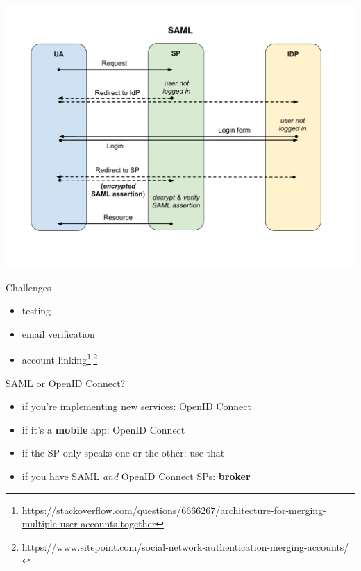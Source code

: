 \documentclass[ignorenonframetext,aspectratio=169]{beamer}
\providecommand{\tightlist}{%
  \setlength{\itemsep}{0pt}\setlength{\parskip}{0pt}}
\begin{document}
\begin{frame}[plain]
\centering
\includegraphics[height=\paperheight]{fedsso-security-saml.pdf}
\end{frame}

\begin{frame}{Challenges}

\begin{itemize}
\tightlist
\item testing
\item email verification
\item account linking\footnote{
        \url{https://stackoverflow.com/questions/6666267/architecture-for-merging-multiple-user-accounts-together}
    }\textsuperscript{,}\footnote{
        \url{https://www.sitepoint.com/social-network-authentication-merging-accounts/}
    }
\end{itemize}
\end{frame}

\begin{frame}{SAML or OpenID Connect?}
\begin{itemize}
\tightlist
\item if you're implementing new services: OpenID Connect
\item if it's a {\bf mobile} app: OpenID Connect
\item if the SP only speaks one or the other: use that
\item if you have SAML {\em and} OpenID Connect SPs: {\bf broker}
\end{itemize}
\end{frame}
\end{document}
